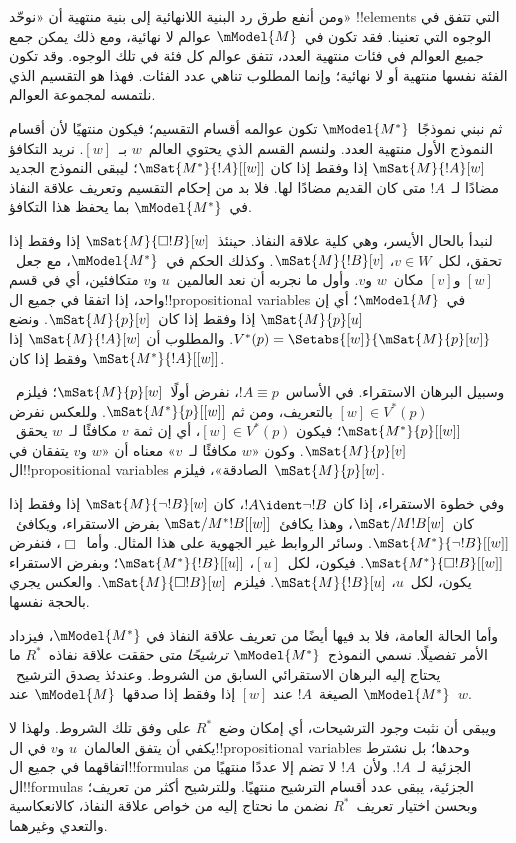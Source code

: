 \documentclass[../../../include/open-logic-section]{subfiles}
\begin{document}
ومن أنفع طرق رد البنية اللانهائية إلى بنية منتهية
أن «نوحّد» !!{element}s التي تتفق في الوجوه التي
تعنينا. فقد تكون في~$\mModel{M}$ عوالم لا نهائية،
ومع ذلك يمكن جمع \emph{جميع} العوالم في فئات منتهية
العدد، تتفق عوالم كل فئة في تلك الوجوه. وقد تكون
الفئة نفسها منتهية أو لا نهائية؛ وإنما المطلوب
تناهي عدد الفئات. فهذا هو التقسيم الذي نلتمسه
لمجموعة العوالم.

ثم نبني نموذجًا~$\mModel{M^*}$ تكون عوالمه أقسام
التقسيم؛ فيكون منتهيًا لأن أقسام النموذج الأول
منتهية العدد. ولنسم القسم الذي يحتوي العالم~$w$
بـ~$[w]$. نريد التكافؤ
$\mSat{M}{!A}[w]$ إذا وفقط إذا كان
$\mSat{M^*}{!A}[{[w]}]$؛ ليبقى النموذج الجديد
مضادًا لـ~$!A$ متى كان القديم مضادًا لها.
فلا بد من إحكام التقسيم وتعريف علاقة النفاذ
في~$\mModel{M^*}$ بما يحفظ هذا التكافؤ.

لنبدأ بالحال الأيسر، وهي كلية علاقة النفاذ.
  حينئذ~$\mSat{M}{\Box !B}[w]$ إذا وفقط إذا تحقق، لكل~$v \in W$،
  $\mSat{M}{!B}[v]$.
وكذلك الحكم في~$\mModel{M^*}$، مع جعل~$[w]$
و$[v]$ مكان~$w$ و$v$. وأول ما نجربه أن نعد
العالمين~$u$ و$v$ متكافئين، أي في قسم واحد،
إذا اتفقا في جميع ال!!{propositional variable}s
في~$\mModel{M}$؛ أي إن
$\mSat{M}{p}[u]$ إذا وفقط إذا كان~$\mSat{M}{p}[v]$.
ونضع $V^*(p)=\Setabs{[w]}{\mSat{M}{p}[w]}$.
والمطلوب أن $\mSat{M}{!A}[w]$ إذا وفقط إذا كان
$\mSat{M^*}{!A}[{[w]}]$.

وسبيل البرهان الاستقراء. في الأساس~$!A \equiv p$،
نفرض أولًا~$\mSat{M}{p}[w]$؛ فيلزم~$[w] \in V^*(p)$
بالتعريف، ومن ثم $\mSat{M^*}{p}[{[w]}]$.
وللعكس نفرض $\mSat{M^*}{p}[{[w]}]$؛ فيكون
$[w] \in V^*(p)$، أي إن ثمة $v$ مكافئًا لـ~$w$
يحقق~$\mSat{M}{p}[v]$. وكون «$w$ مكافئًا
لـ~$v$» معناه أن «$w$ و$v$ يتفقان في
ال!!{propositional variable}s الصادقة»، فيلزم~$\mSat{M}{p}[w]$.

وفي خطوة الاستقراء، إذا كان $!A \ident \lnot !B$،
كان $\mSat{M}{\lnot !B}[w]$ إذا وفقط إذا كان~$\mSat/{M}{!B}[w]$،
وهذا يكافئ~$\mSat/{M^*}{!B}[{[w]}]$ بفرض الاستقراء،
ويكافئ~$\mSat{M^*}{\lnot !B}[{[w]}]$. وسائر
الروابط غير الجهوية على هذا المثال.
وأما~$\Box$، فنفرض
$\mSat{M^*}{\Box !B}[{[w]}]$. فيكون، لكل~$[u]$،
$\mSat{M^*}{!B}[{[u]}]$؛ وبفرض الاستقراء يكون، لكل~$u$،
$\mSat{M}{!B}[u]$. فيلزم~$\mSat{M}{\Box !B}[w]$.
والعكس يجري بالحجة نفسها.

وأما الحالة العامة، فلا بد فيها أيضًا من تعريف
علاقة النفاذ في $\mModel{M^*}$، فيزداد الأمر تفصيلًا.
نسمي النموذج~$\mModel{M^*}$ \emph{ترشيحًا} متى حققت
علاقة نفاذه~$R^*$ ما يحتاج إليه البرهان الاستقرائي
السابق من الشروط. وعندئذ يصدق الترشيح~$\mModel{M^*}$
الصيغة~$!A$ عند $[w]$ إذا وفقط إذا صدقها~$\mModel{M}$
عند~$w$.

ويبقى أن نثبت \emph{وجود} الترشيحات، أي إمكان وضع~$R^*$
على وفق تلك الشروط. ولهذا لا يكفي أن يتفق العالمان~$u$
و$v$ في ال!!{propositional variable}s وحدها؛ بل
نشترط اتفاقهما في جميع ال!!{formula}s الجزئية لـ~$!A$.
ولأن~$!A$ لا تضم إلا عددًا منتهيًا من ال!!{formula}s
الجزئية، يبقى عدد أقسام الترشيح منتهيًا.
وللترشيح أكثر من تعريف؛ وبحسن اختيار تعريف~$R^*$
نضمن ما نحتاج إليه من خواص علاقة النفاذ،
كالانعكاسية والتعدي وغيرهما.
\end{document}
